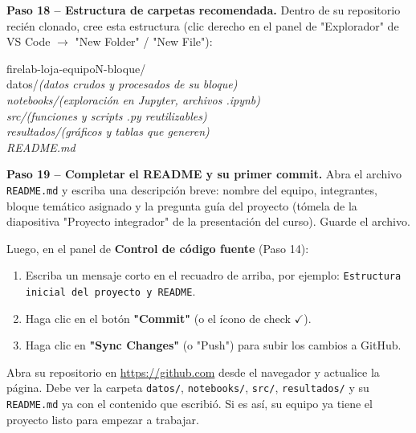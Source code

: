 \documentclass[11pt,a4paper]{article}
\newcommand{\code}[1]{\texttt{#1}}
\newcommand{\link}[1]{\url{#1}}
\begin{document}
\begin{stepbox}
\textbf{Paso 18 -- Estructura de carpetas recomendada.} Dentro de su repositorio recién clonado, cree esta estructura (clic derecho en el panel de "Explorador" de VS Code $\to$ "New Folder" / "New File"):
\begin{center}
\begin{minipage}{0.75\textwidth}
\ttfamily
firelab-loja-equipoN-bloque/\\
\hspace*{1em}datos/\quad\rmfamily\itshape (datos crudos y procesados de su bloque)\\
\ttfamily\hspace*{1em}notebooks/\quad\rmfamily\itshape (exploración en Jupyter, archivos .ipynb)\\
\ttfamily\hspace*{1em}src/\quad\rmfamily\itshape (funciones y scripts .py reutilizables)\\
\ttfamily\hspace*{1em}resultados/\quad\rmfamily\itshape (gráficos y tablas que generen)\\
\ttfamily\hspace*{1em}README.md
\end{minipage}
\end{center}
\end{stepbox}

\begin{stepbox}
\textbf{Paso 19 -- Completar el README y su primer commit.} Abra el archivo \code{README.md} y escriba una descripción breve: nombre del equipo, integrantes, bloque temático asignado y la pregunta guía del proyecto (tómela de la diapositiva "Proyecto integrador" de la presentación del curso). Guarde el archivo.

Luego, en el panel de \textbf{Control de código fuente} (Paso 14):
\begin{enumerate}
  \item Escriba un mensaje corto en el recuadro de arriba, por ejemplo: \code{Estructura inicial del proyecto y README}.
  \item Haga clic en el botón \textbf{"Commit"} (o el ícono de check $\checkmark$).
  \item Haga clic en \textbf{"Sync Changes"} (o "Push") para subir los cambios a GitHub.
\end{enumerate}
\end{stepbox}

\begin{verify}
Abra su repositorio en \link{https://github.com} desde el navegador y actualice la página. Debe ver la carpeta \code{datos/}, \code{notebooks/}, \code{src/}, \code{resultados/} y su \code{README.md} ya con el contenido que escribió. Si es así, su equipo ya tiene el proyecto listo para empezar a trabajar.
\end{verify}
\end{document}
